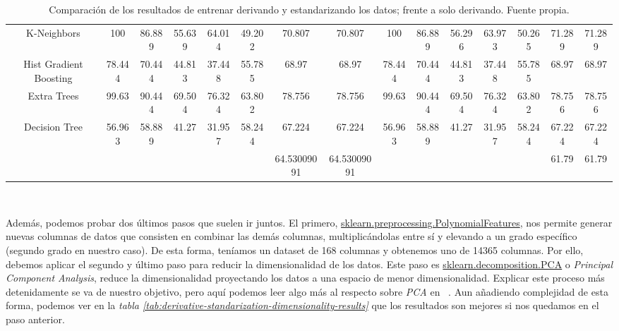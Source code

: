 \begin{table}[!ht]
{\begin{tabular}{|c|ccccccc|ccccccc|}
        K-Neighbors & 100 & 86.889 & 55.639 & 64.014 & 49.202 & 70.807 & 70.807 & 100 & 86.889 & 56.296 & 63.973 & 50.265 & 71.289 & 71.289 \\
        Hist Gradient Boosting & 78.444 & 70.444 & 44.813 & 37.448 & 55.785 & 68.97 & 68.97 & 78.444 & 70.444 & 44.813 & 37.448 & 55.785 & 68.97 & 68.97 \\
        Extra Trees & 99.63 & 90.444 & 69.504 & 76.324 & 63.802 & 78.756 & 78.756 & 99.63 & 90.444 & 69.504 & 76.324 & 63.802 & 78.756 & 78.756 \\
        Decision Tree & 56.963 & 58.889 & 41.27 & 31.957 & 58.244 & 67.224 & 67.224 & 56.963 & 58.889 & 41.27 & 31.957 & 58.244 & 67.224 & 67.224 \\ \hline
        & & & & & & 64.53009091 & 64.53009091 & & & & & & 61.79 & 61.79 \\ \hline
        \end{tabular}}
    \caption{Comparación de los resultados de entrenar derivando y estandarizando los datos; frente a solo derivando. Fuente propia.}\ \label{tab:derivative-standarization-results}
\end{table}


Además, podemos probar dos últimos pasos que suelen ir juntos. El primero, \href{https://scikit-learn.org/stable/modules/generated/sklearn.preprocessing.PolynomialFeatures.html}{sklearn.preprocessing.PolynomialFeatures}, 
nos permite generar nuevas columnas de datos que consisten en combinar las demás columnas, multiplicándolas entre sí y elevando a un grado específico (segundo grado en nuestro caso). 
De esta forma, teníamos un \gls{dataset} de 168 columnas y obtenemos uno de 14365 columnas. Por ello, debemos aplicar el segundo y último paso para reducir la dimensionalidad
de los datos. Este paso es \href{https://scikit-learn.org/stable/modules/generated/sklearn.decomposition.PCA.html}{sklearn.decomposition.PCA} o \textit{Principal Component Analysis},
reduce la dimensionalidad proyectando los datos a una espacio de menor dimensionalidad. Explicar este proceso más detenidamente se va de nuestro objetivo, pero
aquí podemos leer algo más al respecto sobre \textit{PCA} en \ \cite{Principa62:online}.
Aun añadiendo complejidad de esta forma, podemos ver en la \textit{tabla \ref{tab:derivative-standarization-dimensionality-results}} que los resultados son mejores si
nos quedamos en el paso anterior.

